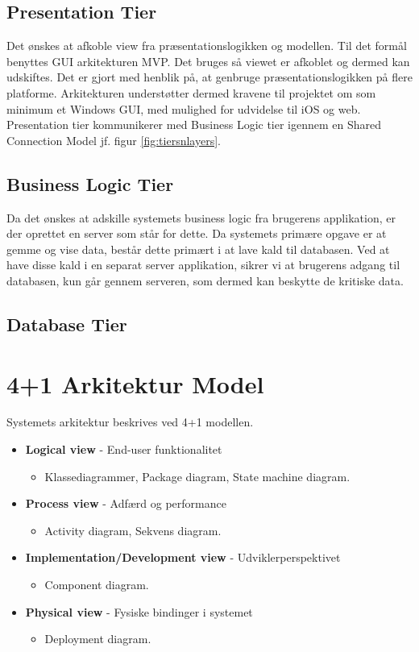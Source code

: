 \subsection{Presentation Tier}
Det ønskes at afkoble view fra præsentationslogikken og modellen. Til det formål benyttes GUI arkitekturen MVP. Det bruges så viewet er afkoblet og dermed kan udskiftes. Det er gjort med henblik på, at genbruge præsentationslogikken på flere platforme. Arkitekturen understøtter dermed kravene til projektet om som minimum et Windows GUI, med mulighed for udvidelse til iOS og web. Presentation tier kommunikerer med Business Logic tier igennem en Shared Connection Model jf. figur \ref{fig:tiersnlayers}. 

\subsection{Business Logic Tier}
Da det ønskes at adskille systemets business logic fra brugerens applikation, er der oprettet en server som står for dette. Da systemets primære opgave er at gemme og vise data, består dette primært i at lave kald til databasen. Ved at have disse kald i en separat server applikation, sikrer vi at brugerens adgang til databasen, kun går gennem serveren, som dermed kan beskytte de kritiske data.

\subsection{Database Tier}

\section{4+1 Arkitektur Model}
Systemets arkitektur beskrives ved 4+1 modellen. 



\begin{itemize}
	\item \textbf{Logical view} - End-user funktionalitet
	\begin{itemize}
		\item Klassediagrammer, Package diagram, State machine diagram.
	\end{itemize}
	\item \textbf{Process view} - Adfærd og performance
	\begin{itemize}
		\item Activity diagram, Sekvens diagram.
	\end{itemize}
	\item \textbf{Implementation/Development view} - Udviklerperspektivet
	\begin{itemize}
		\item Component diagram.
	\end{itemize}
	\item \textbf{Physical view} - Fysiske bindinger i systemet
	\begin{itemize}
		\item Deployment diagram.
	\end{itemize}
\end{itemize}





